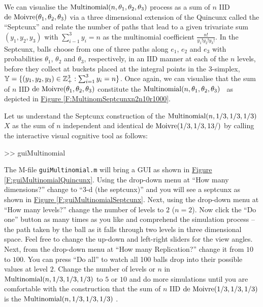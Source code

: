 We can visualise the $\mbox{{\rm Multinomial}}(n,\theta_1,\theta_2,\theta_3)$ process as a sum of $n$ IID $\mbox{{\rm de~Moivre}}(\theta_1,\theta_2,\theta_3)$  via a three dimensional extension of the Quincunx called the ``Septcunx'' and relate the number of paths that lead to a given trivariate sum $(y_1,y_2,y_3)$ with $\sum_{i-1}^3 y_i = n$ as the multinomial coefficient $\frac{n!}{y_1! y_2! y_3!}$.  In the Septcunx, balls choose from one of three paths along $e_1$, $e_2$ and $e_3$ with probabilities $\theta_1$, $\theta_2$ and $\theta_3$, respectively, in an IID manner at each of the $n$ levels, before they collect at buckets placed at the integral points in the $3$-simplex, $\mathbb{Y} = \{(y_1,y_2,y_3) \in \mathbb{Z}_+^3 : \sum_{i=1}^3 y_i=n \}$.  Once again, we can visualise that the sum of $n$ IID $\mbox{{\rm de~Moivre}}(\theta_1,\theta_2,\theta_3)$  constitute the $\mbox{{\rm Multinomial}}(n,\theta_1,\theta_2,\theta_3)$ \rv~as depicted in \hyperref[F:MultinomSeptcunxn2n10r1000]{Figure \ref*{F:MultinomSeptcunxn2n10r1000}}.

\begin{labwork}\label{LW:SeptcunxSampler}
Let us understand the Septcunx construction of the $\mbox{{\rm Multinomial}}(n,1/3,1/3,1/3)$ \rv $X$ as the sum of $n$ independent and identical $\mbox{{\rm de~Moivre}}(1/3,1/3,13/)$  by calling the interactive visual cognitive tool as follows:
\begin{VrbM}
>> guiMultinomial
\end{VrbM}
The M-file {\tt guiMultinomial.m} will bring a GUI as shown in \hyperref[F:guiMultinomialQuincunx]{Figure \ref*{F:guiMultinomialQuincunx}}.  Using the drop-down menu at ``How many dimensions?'' change to ``3-d (the septcunx)'' and you will see a septcunx as shown in \hyperref[F:guiMultinomialSeptcunx]{Figure \ref*{F:guiMultinomialSeptcunx}}.  Next, using the drop-down menu at ``How many levels?'' change the number of levels to $2$ ($n=2$).  Now click the ``Do one'' button as many times as you like and comprehend the simulation process -- the path taken by the ball as it falls through two levels in three dimensional space.  Feel free to change the up-down and left-right sliders for the view angles.  Next, from the drop-down menu at ``How many  Replication?'' change it from $10$ to $100$.  You can press ``Do all'' to watch all 100 balls drop into their possible values at level $2$.  Change the number of levels or $n$ in $\mbox{{\rm Multinomial}}(n,1/3,1/3,1/3)$ \rv to $5$ or $10$ and do more simulations until you are comfortable with the construction that the sum of $n$ IID $\mbox{{\rm de~Moivre}}(1/3,1/3,1/3)$  is the $\mbox{{\rm Multinomial}}(n,1/3,1/3,1/3)$ \rv.
\end{labwork}

